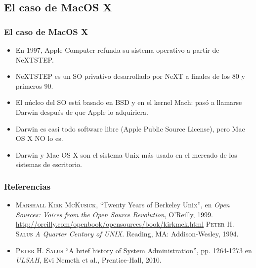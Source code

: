 \documentclass{beamer}
\begin{document}
\subsection{El caso de MacOS X}
\begin{frame}
\frametitle{El caso de MacOS X}

\begin{itemize}
\item En 1997, Apple Computer refunda su sistema operativo a partir de NeXTSTEP. 
\item NeXTSTEP es un SO privativo desarrollado por NeXT a finales de los 80 y primeros 90. 
\item El núcleo del SO está basado en BSD y en el kernel Mach: pasó a llamarse Darwin después de que Apple lo adquiriera. 
\item Darwin es casi todo software libre (Apple Public Source License), pero Mac OS X \alert{NO} lo es.
\item Darwin y Mac OS X son el sistema Unix más usado en el mercado de los sistemas de escritorio. 
\end{itemize}

\end{frame}

\begin{frame}
\frametitle{Referencias}

\begin{itemize}
\item \textsc{Marshall Kirk McKusick}, ``Twenty Years of Berkeley Unix'', en \textit{Open Sources: Voices from the Open Source Revolution}, O'Reilly, 1999.
\url{http://oreilly.com/openbook/opensources/book/kirkmck.html} 
\textsc{Peter H. Salus} \textit{A Quarter Century of UNIX}. Reading, MA: Addison-Wesley, 1994.
\item \textsc{Peter H. Salus} ``A brief history of System Administration'', pp. 1264-1273 en \textit{ULSAH}, Evi Nemeth et al., Prentice-Hall, 2010.

\end{itemize}

\end{frame}



\end{document}
